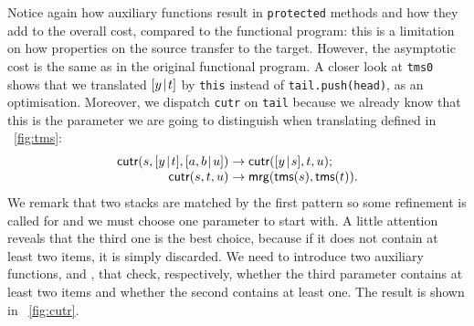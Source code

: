  Notice again how
auxiliary functions result in \texttt{protected} methods and how they
add to the overall cost, compared to the functional program: this is a
limitation on how properties on the source transfer to the
target. However, the asymptotic cost is the same as in the original
functional program. A closer look at \texttt{tms0} shows that we
translated \([{y}\!\mid\!{t}]\) by \texttt{this} instead of
\texttt{tail.push(head)}, as an optimisation. Moreover, we dispatch
\texttt{cutr} on \texttt{tail} because we already know that this is
the parameter we are going to distinguish when translating
 defined in \fig~\vref{fig:tms}:
\begin{equation*}
\begin{array}{@{}r@{\;}l@{\;}l@{}}
\fun{cutr}(s,\cons{y}{t},\cons{a,b}{u})
                       & \rightarrow & \fun{cutr}(\cons{y}{s},t,u);\\
\fun{cutr}(s,t,u)      & \rightarrow
                       & \fun{mrg}(\fun{tms}(s),\fun{tms}(t)).
\end{array}
\end{equation*}
We remark that two stacks are matched by the first pattern so some
refinement is called for and we must choose one parameter to start
with. A little attention reveals that the third one is the best
choice, because if it does not contain at least two items, it is
simply discarded. We need to introduce two auxiliary functions,
 and , that check, respectively,
whether the third parameter contains at least two items and whether
the second contains at least one. The result is shown in
\fig~\ref{fig:cutr}.


